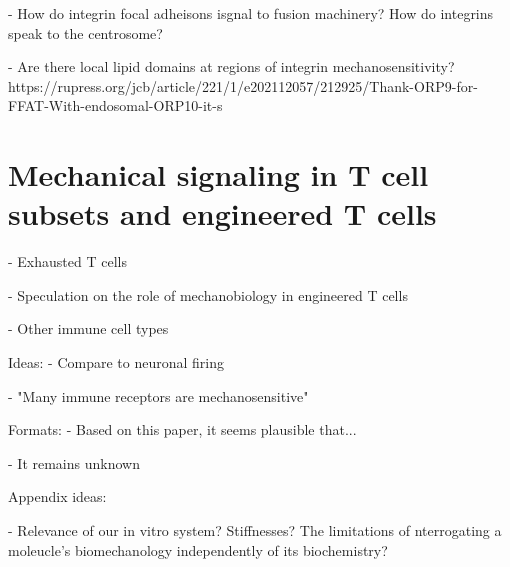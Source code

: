- How do integrin focal adheisons isgnal to fusion machinery? How do integrins speak to the centrosome?

- Are there local lipid domains at regions of integrin mechanosensitivity? https://rupress.org/jcb/article/221/1/e202112057/212925/Thank-ORP9-for-FFAT-With-endosomal-ORP10-it-s

\section{Mechanical signaling in T cell subsets and engineered T cells}

- Exhausted T cells

- Speculation on the role of mechanobiology in engineered T cells

- Other immune cell types


Ideas:
- Compare to neuronal firing

- "Many immune receptors are mechanosensitive"

Formats:
- Based on this paper, it seems plausible that...

- It remains unknown 

Appendix ideas:

- Relevance of our in vitro system? Stiffnesses? The limitations of nterrogating a moleucle's biomechanology independently of its biochemistry?